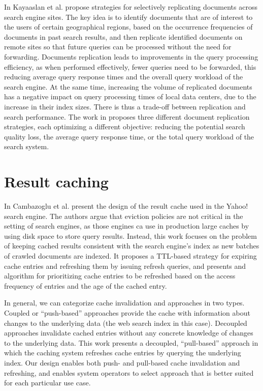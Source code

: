 \medskip
\noindent
In \cite{frances:multisiteefficiency} Kayaaslan et al.
propose strategies for selectively replicating documents across search engine sites.
The key idea is to identify documents that are of interest to the users of certain geographical regions,
based on the occurrence frequencies of documents in past search results,
and then replicate identified documents on remote sites so that future queries can be processed without the need for
forwarding.
Documents replication leads to improvements in the query processing efficiency, as when performed effectively,
fewer queries need to be forwarded, this reducing average query response times and the overall query workload of the search engine.
At the same time, increasing the volume of replicated documents has a negative impact on query processing times of local data centers,
due to the increase in their index sizes.
There is thus a trade-off between replication and search performance.
The work in \cite{kayaaslan:multisitereplication}
proposes three different document replication strategies, each optimizing a different objective:
reducing the potential search quality loss, the average query response time, or the total query workload of the search system.



\section{Result caching}

In \cite{cambazoglu:yahoorefreshing} Cambazoglu et al. present the design of the result cache used
in the Yahoo! search engine.
The authors argue that eviction policies are not critical in the setting of search engines, as those engines ca use
in production large caches by using disk space to store query results.
Instead, this work focuses on the problem of keeping cached results consistent with the search engine’s index
as new batches of crawled documents are indexed.
It proposes a TTL-based strategy for expiring cache entries
and refreshing them by issuing refresh queries,
and presents and algorithm for prioritizing cache entries to be refreshed based on the access frequency of entries and
the age of the cached entry.

In general, we can categorize cache invalidation and approaches in two types.
Coupled or ``push-based'' approaches provide the cache with information about changes to the underlying data
(the web search index in this case).
Decoupled approaches invalidate cached entries without any concrete knowledge of changes to the underlying data.
This work presents a decoupled, ``pull-based'' approach in which the caching system refreshes cache entries by querying
the underlying index.
Our design enables both push- and pull-based cache invalidation and refreshing,
and enables system operators to select approach that is better suited for each particular use case.


